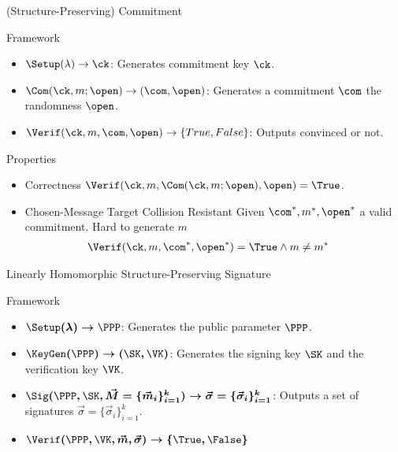 \begin{frame}{(Structure-Preserving) Commitment}

  \begin{block}{Framework}
      \begin{itemize}
      \item $\Setup(\lambda) \to \ck$: Generates commitment key $\ck$.
      \item $\Com(\ck, m; \open) \to (\com,\open)$: Generates a commitment $\com$ \wrt the randomness $\open$.
      \item $\Verif(\ck, m, \com, \open) \to \{True, False\}$: Outputs convinced or not.
      \end{itemize}
  \end{block}

  \pause
  
  \begin{block}{Properties}
    \begin{itemize}
    \item {\color{blue}Correctness} $\Verif(\ck, m, \Com(\ck, m; \open), \open) = \True$.
    \item {\color{blue}Chosen-Message Target Collision Resistant} Given $\com^*, m^*, \open^*$ a valid commitment. Hard to generate $m$ \st
      \begin{align*}
        \Verif(\ck, m, \com^*, \open^*) &= \True \wedge m\neq m^*
      \end{align*}
    \end{itemize}
  \end{block}

\end{frame}


\begin{frame}{Linearly Homomorphic Structure-Preserving Signature}
  \begin{block}{Framework}
  \begin{itemize}
  \item $\boldmath{\Setup(\lambda) \to \PPP}$: Generates the public parameter $\PPP$.
  \item $\boldmath{\KeyGen(\PPP) \to (\SK, \VK)}$: Generates the signing key $\SK$ and the verification key $\VK$.
  \item $\boldmath{\Sig(\PPP, \SK, \vec{M} = \{\vec{m}_i\}_{i=1}^k) \to \vec{\sigma} = \{\vec{\sigma}_i\}_{i=1}^k}$: Outputs a set of signatures $\vec{\sigma} = \{\vec{\sigma}_i\}_{i=1}^k$.
  \item $\boldmath{\Verif(\PPP, \VK, \vec{m}, \vec{\sigma}) \to \{\True, \False\}}$
  \end{itemize}
  \end{block}
\end{frame}

